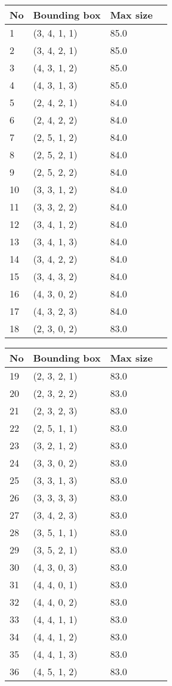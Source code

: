 %
    \renewcommand{\arraystretch}{0.8}
    \begin{tabular}{|l|l|l|l|}
    \hline
    No &  Bounding box &  Max size  \\
    \hline%
    
1&(3, 4, 1, 1)& 85.0\\
2&(3, 4, 2, 1)& 85.0\\
3&(4, 3, 1, 2)& 85.0\\
4&(4, 3, 1, 3)& 85.0\\
5&(2, 4, 2, 1)& 84.0\\
6&(2, 4, 2, 2)& 84.0\\
7&(2, 5, 1, 2)& 84.0\\
8&(2, 5, 2, 1)& 84.0\\
9&(2, 5, 2, 2)& 84.0\\
10&(3, 3, 1, 2)& 84.0\\
11&(3, 3, 2, 2)& 84.0\\
12&(3, 4, 1, 2)& 84.0\\
13&(3, 4, 1, 3)& 84.0\\
14&(3, 4, 2, 2)& 84.0\\
15&(3, 4, 3, 2)& 84.0\\
16&(4, 3, 0, 2)& 84.0\\
17&(4, 3, 2, 3)& 84.0\\
18&(2, 3, 0, 2)& 83.0\\
%
    \hline
    \end{tabular}%
%
    \renewcommand{\arraystretch}{0.8}
    \begin{tabular}{|l|l|l|l|}
    \hline
    No &  Bounding box &  Max size  \\
    \hline%
    
19&(2, 3, 2, 1)& 83.0\\
20&(2, 3, 2, 2)& 83.0\\
21&(2, 3, 2, 3)& 83.0\\
22&(2, 5, 1, 1)& 83.0\\
23&(3, 2, 1, 2)& 83.0\\
24&(3, 3, 0, 2)& 83.0\\
25&(3, 3, 1, 3)& 83.0\\
26&(3, 3, 3, 3)& 83.0\\
27&(3, 4, 2, 3)& 83.0\\
28&(3, 5, 1, 1)& 83.0\\
29&(3, 5, 2, 1)& 83.0\\
30&(4, 3, 0, 3)& 83.0\\
31&(4, 4, 0, 1)& 83.0\\
32&(4, 4, 0, 2)& 83.0\\
33&(4, 4, 1, 1)& 83.0\\
34&(4, 4, 1, 2)& 83.0\\
35&(4, 4, 1, 3)& 83.0\\
36&(4, 5, 1, 2)& 83.0\\
%
    \hline
    \end{tabular}%
